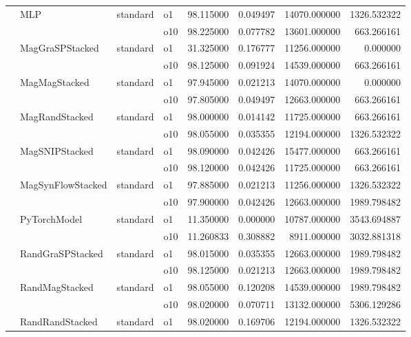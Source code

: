 \begin{longtable}{llllrrrr}
      & MLP & standard & o1 &  98.115000 &   0.049497 &     14070.000000 &   1326.532322 \\
      &     &         & o10 &  98.225000 &   0.077782 &     13601.000000 &    663.266161 \\
      & MagGraSPStacked & standard & o1 &  31.325000 &   0.176777 &     11256.000000 &      0.000000 \\
      &     &         & o10 &  98.125000 &   0.091924 &     14539.000000 &    663.266161 \\
      & MagMagStacked & standard & o1 &  97.945000 &   0.021213 &     14070.000000 &      0.000000 \\
      &     &         & o10 &  97.805000 &   0.049497 &     12663.000000 &    663.266161 \\
      & MagRandStacked & standard & o1 &  98.000000 &   0.014142 &     11725.000000 &    663.266161 \\
      &     &         & o10 &  98.055000 &   0.035355 &     12194.000000 &   1326.532322 \\
      & MagSNIPStacked & standard & o1 &  98.090000 &   0.042426 &     15477.000000 &    663.266161 \\
      &     &         & o10 &  98.120000 &   0.042426 &     11725.000000 &    663.266161 \\
      & MagSynFlowStacked & standard & o1 &  97.885000 &   0.021213 &     11256.000000 &   1326.532322 \\
      &     &         & o10 &  97.900000 &   0.042426 &     12663.000000 &   1989.798482 \\
      & PyTorchModel & standard & o1 &  11.350000 &   0.000000 &     10787.000000 &   3543.694887 \\
      &     &         & o10 &  11.260833 &   0.308882 &      8911.000000 &   3032.881318 \\
      & RandGraSPStacked & standard & o1 &  98.015000 &   0.035355 &     12663.000000 &   1989.798482 \\
      &     &         & o10 &  98.125000 &   0.021213 &     12663.000000 &   1989.798482 \\
      & RandMagStacked & standard & o1 &  98.055000 &   0.120208 &     14539.000000 &   1989.798482 \\
      &     &         & o10 &  98.020000 &   0.070711 &     13132.000000 &   5306.129286 \\
      & RandRandStacked & standard & o1 &  98.020000 &   0.169706 &     12194.000000 &   1326.532322 \\

\end{longtable}
